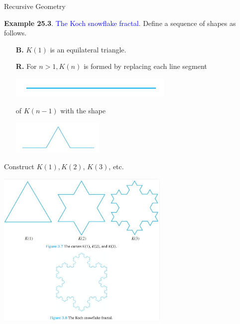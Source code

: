 \documentclass[aspectratio=169]{beamer}
\providecommand{\Blue}[1]{\textcolor{blue}{#1}}
\begin{document}
\begin{frame}[plain]{Recursive Geometry}

{\bf Example 25.3}. \Blue{The Koch snowflake fractal}.
     Define a sequence of shapes as follows.
     
     \begin{itemize}
          \item[{\bf B.}] $K(1)$ is an equilateral triangle.
          \item[{\bf R.}] For $n>1, K(n)$ is formed by replacing
             each line segment
      \begin{center}
      \includegraphics[height=.5cm]{./img/lecture25-fig2a.png}  
     \end{center}
              of $K(n-1)$ with the shape
      \begin{center}
      \includegraphics[height=1.6cm]{./img/lecture25-fig2b.png}  
     \end{center}
              
       \end{itemize}
  

   Construct $K(1), K(2)$, $K(3)$, etc.
   \vspace{.5in}
   

\end{frame}

\begin{frame}[plain]{}

  \begin{center}
      \includegraphics[height=7.5cm]{./img/lecture25-fig2c.png}  
     \end{center}
     
\end{frame}
\end{document}
